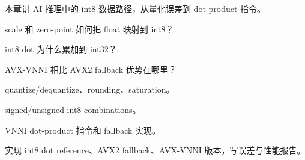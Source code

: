{本章讲 AI 推理中的 int8 数据路径，从量化误差到 dot product 指令。}
{\item scale 和 zero-point 如何把 float 映射到 int8？
\item int8 dot 为什么累加到 int32？
\item AVX-VNNI 相比 AVX2 fallback 优势在哪里？}
{\item quantize/dequantize、rounding、saturation。
\item signed/unsigned int8 combinations。
\item VNNI dot-product 指令和 fallback 实现。}
{实现 int8 dot reference、AVX2 fallback、AVX-VNNI 版本，写误差与性能报告。}
